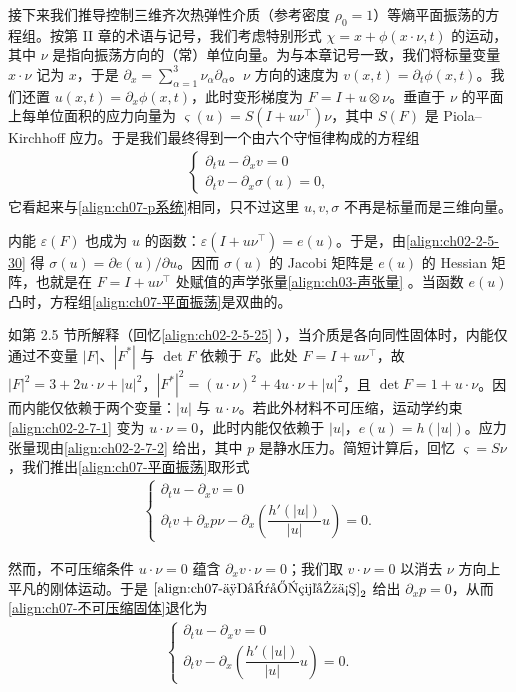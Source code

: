 \documentclass[../../main.tex]{subfiles}
\begin{document}
接下来我们推导控制三维齐次热弹性介质（参考密度 $\rho_0=1$）等熵平面振荡的方程组。按第 II 章的术语与记号，我们考虑特别形式 $\chi=x+\phi(x\cdot\nu,t)$ 的运动，其中 $\nu$ 是指向振荡方向的（常）单位向量。为与本章记号一致，我们将标量变量 $x\cdot\nu$ 记为 $x$，于是 $\partial_x=\sum_{\alpha=1}^3\nu_\alpha\partial_\alpha$。$\nu$ 方向的速度为 $v(x,t)=\partial_t\phi(x,t)$。我们还置 $u(x,t)=\partial_x\phi(x,t)$，此时变形梯度为 $F=I+u\otimes\nu$。垂直于 $\nu$ 的平面上每单位面积的应力向量为 $\varsigma(u)=S(I+u\nu^\top)\nu$，其中 $S(F)$ 是 Piola--Kirchhoff 应力。于是我们最终得到一个由六个守恒律构成的方程组
\begin{align}
\begin{cases}
\partial_t u-\partial_x v=0\\
\partial_t v-\partial_x\sigma(u)=0,
\end{cases}
\label{align:ch07-平面振荡}
\end{align}
它看起来与\eqref{align:ch07-p系统}相同，只不过这里 $u,v,\sigma$ 不再是标量而是三维向量。

内能 $\varepsilon(F)$ 也成为 $u$ 的函数：$\varepsilon(I+u\nu^\top)=e(u)$。于是，由\eqref{align:ch02-2-5-30}
得 $\sigma(u)=\partial e(u)/\partial u$。因而 $\sigma(u)$ 的 Jacobi 矩阵是 $e(u)$ 的 Hessian 矩阵，也就是在 $F=I+u\nu^\top$ 处赋值的声学张量\eqref{align:ch03-声张量}
。当函数 $e(u)$ 凸时，方程组\eqref{align:ch07-平面振荡}是双曲的。

如第 2.5 节所解释（回忆\eqref{align:ch02-2-5-25}
），当介质是各向同性固体时，内能仅通过不变量 $|F|$、$|F^*|$ 与 $\det F$ 依赖于 $F$。此处 $F=I+u\nu^\top$，故 $|F|^2=3+2u\cdot\nu+|u|^2$，$|F^*|^2=(u\cdot\nu)^2+4u\cdot\nu+|u|^2$，且 $\det F=1+u\cdot\nu$。因而内能仅依赖于两个变量：$|u|$ 与 $u\cdot\nu$。若此外材料不可压缩，运动学约束\eqref{align:ch02-2-7-1}
变为 $u\cdot\nu=0$，此时内能仅依赖于 $|u|$，$e(u)=h(|u|)$。应力张量现由\eqref{align:ch02-2-7-2}
给出，其中 $p$ 是静水压力。简短计算后，回忆 $\varsigma=S\nu$，我们推出\eqref{align:ch07-平面振荡}取形式
\begin{align}
\begin{cases}
\partial_t u-\partial_x v=0\\
\partial_t v+\partial_x p\nu-\partial_x\left(\dfrac{h'(|u|)}{|u|}u\right)=0.
\end{cases}
\label{align:ch07-不可压缩固体}
\end{align}

然而，不可压缩条件 $u\cdot\nu=0$ 蕴含 $\partial_x v\cdot\nu=0$；我们取 $v\cdot\nu=0$ 以消去 $\nu$ 方向上平凡的刚体运动。于是 $\eqref{align:ch07-不可压缩固体}_2$ 给出 $\partial_x p=0$，从而\eqref{align:ch07-不可压缩固体}退化为
\begin{align}
\begin{cases}
\partial_t u-\partial_x v=0\\
\partial_t v-\partial_x\left(\dfrac{h'(|u|)}{|u|}u\right)=0.
\end{cases}
\label{align:ch07-各向同性不可压缩}
\end{align}
\end{document}
